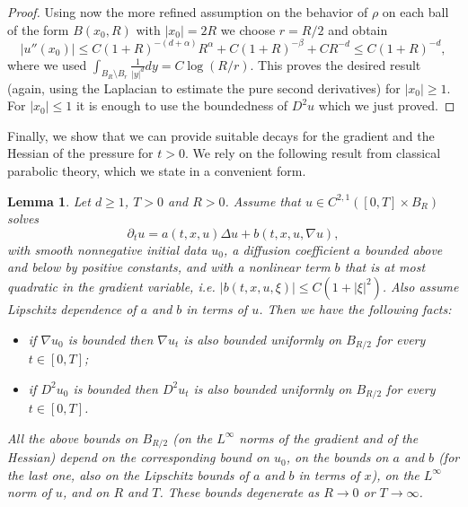 \documentclass[11pt,a4paper]{article}
\numberwithin{equation}{section}
\theoremstyle{plain}
\newtheorem{lemma}[theorem]{Lemma}
\theoremstyle{remark}
\begin{document}
\begin{proof}
Using now the more refined assumption on the behavior of $\rho$ on each ball of the form $B(x_0,R)$ with $|x_0| = 2R$ we choose $r=R/2$ and obtain
$$|u''(x_0)|\leq C(1+R)^{-(d+\alpha)}R^\alpha+C(1+R)^{-\beta}+CR^{-d}\leq C(1+R)^{-d},$$
where we used $\int_{B_R\setminus B_r}\frac{1}{|y|^d}dy=C\log(R/r)$.  This proves the desired result (again, using the Laplacian to estimate the pure second derivatives) for $|x_0|\geq 1$. For $|x_0|\leq 1$ it is enough to use the boundedness of $D^2u$ which we just proved.
\end{proof}


Finally, we show that we can provide suitable decays for the gradient and the Hessian of the pressure for $t>0$. We rely on the following result from classical parabolic theory, which we state in a convenient form.

\begin{lemma}\label{lem:regularity_lieberman}
Let $d\ge 1$, $T>0$ and $R>0$.  
Assume that $u\in C^{2,1} \left([0,T]\times B_R \right)$ solves
\begin{equation}\label{eq:mainPDE}
    \partial_t u  =  a(t,x,u)\Delta u  +  b \left(t,x,u,\nabla u \right),
\end{equation}
with smooth nonnegative initial data $u_0$, a diffusion coefficient $a$ bounded above and below by positive constants, and with a nonlinear term $b$ that is at most quadratic in the gradient variable, i.e. $|b(t,x,u,\xi)|\leq C(1+|\xi|^2)$. Also assume Lipschitz dependence of $a$ and $b$ in terms of $u$. Then we have the following facts:
\begin{itemize}
\item if $\nabla u_0$ is bounded then $\nabla u_t$ is also bounded uniformly on $B_{R/2}$ for every $t\in [0,T]$;
\item if $D^2 u_0$ is bounded then $D^2 u_t$ is also bounded uniformly on $B_{R/2}$ for every $t\in [0,T]$.
\end{itemize}
All the above bounds on $B_{R/2}$ (on the %
$L^\infty$ norms of the gradient and of the Hessian) depend on the corresponding bound on $u_0$, on the bounds on $a$ and $b$ (for the last one, also on the Lipschitz bounds of $a$ and $b$ in terms of $x$), on the $L^\infty$ norm of $u$, and on $R$ and $T$. 
These bounds degenerate as $R\to 0$ or $T\to\infty$. 
\end{lemma}
\end{document}
